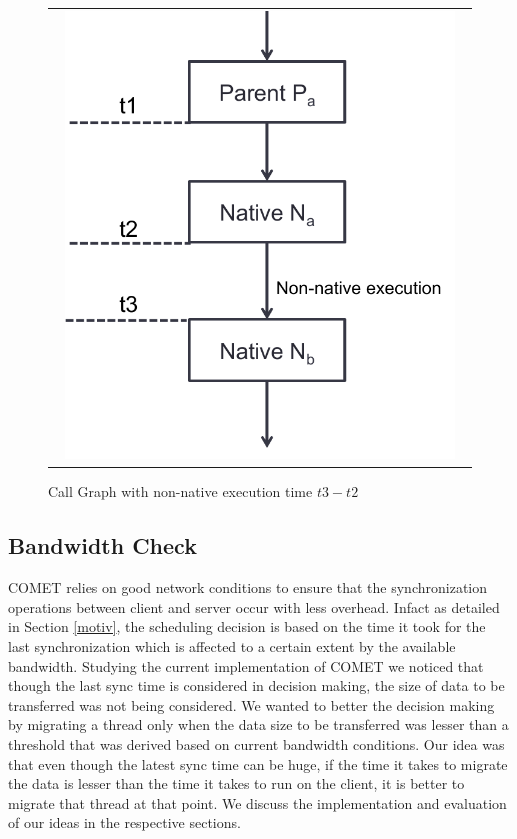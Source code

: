 \begin{figure} [thf*]
\centering
\begin{tabular}{c}
\begin{minipage}[b]{0.5\textwidth}
\includegraphics[width=0.95\textwidth]{figs/native_native.pdf}
\end{minipage}
\end{tabular}
\caption{Call Graph with non-native execution time $t3-t2$}
\label{fig:native_native}
\end{figure}

\subsection{Bandwidth Check}
COMET relies on good network conditions to ensure that the synchronization operations between client and server occur with less overhead. Infact as detailed in Section \ref{motiv}, the scheduling decision is based on the time it took for the last synchronization which is affected to a certain extent by the available bandwidth. Studying the current implementation of COMET we noticed that though the last sync time is considered in decision making, the size of data to be transferred was not being considered. We wanted to better the decision making by migrating a thread only when the data size to be transferred was lesser than a threshold that was derived based on current bandwidth conditions. Our idea was that even though the latest sync time can be huge, if the time it takes to migrate the data is lesser than the time it takes to run on the client, it is better to migrate that thread at that point. We discuss the implementation and evaluation of our ideas in the respective sections.
